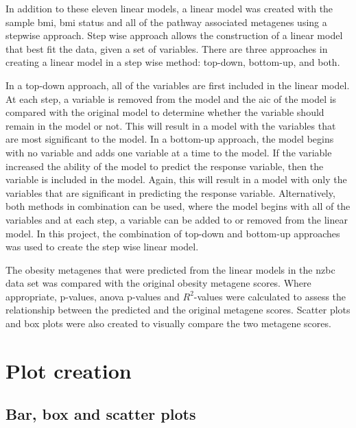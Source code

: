 In addition to these eleven linear models, a linear model was created with the sample \gls{bmi}, \gls{bmi} status and all of the pathway associated metagenes using a stepwise approach.
Step wise approach allows the construction of a linear model that best fit the data, given a set of variables.
There are three approaches in creating a linear model in a step wise method: top-down, bottom-up, and both.

In a top-down approach, all of the variables are first included in the linear model.
At each step, a variable is removed from the model and the \gls{aic} of the model is compared with the original model to determine whether the variable should remain in the model or not.
This will result in a model with the variables that are most significant to the model.
In a bottom-up approach, the model begins with no variable and adds one variable at a time to the model.
If the variable increased the ability of the model to predict the response variable, then the variable is included in the model.
Again, this will result in a model with only the variables that are significant in predicting the response variable.
Alternatively, both methods in combination can be used, where the model begins with all of the variables and at each step, a variable can be added to or removed from the linear model.
In this project, the combination of top-down and bottom-up approaches was used to create the step wise linear model.

The obesity metagenes that were predicted from the linear models in the \gls{nzbc} data set was compared with the original obesity metagene scores.
Where appropriate, p-values, \gls{anova} p-values and  $R^2$-values were calculated to assess the relationship between the predicted and the original metagene scores.
Scatter plots and box plots were also created to visually compare the two metagene scores.

\section{Plot creation}
\label{sec:plot_creation}

\subsection{Bar, box and scatter plots}
\label{sub:box_and_scatter_plots}


